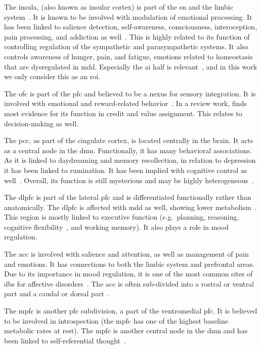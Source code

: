 The insula, (also known as insular cortex) is part of the \gls{sn} and the limbic system~\parencite{Uddin2017}.
It is known to be involved with modulation of emotional processing.
It has been linked to salience detection, self-awareness, consciousness, interoception, pain processing, and addiction as well~\parencite{Menon2010}.
This is highly related to its function of controlling regulation of the sympathetic and parasympathetic systems.
It also controls awareness of hunger, pain, and fatigue, emotions related to homeostasis that are dysregulated in \gls{mdd}.
Especially the \gls{ai} half is relevant~\parencite{Pasquini2020}, and in this work we only consider this as an \gls{roi}.

The \gls{ofc} is part of the \gls{pfc} and believed to be a nexus for sensory integration.
It is involved with emotional and reward-related behavior~\parencite{Kringelbach2005}.
In a review work, \textcite{Stalnaker2015} finds most evidence for its function in credit and value assignment.
This relates to decision-making as well.

The \gls{pcc}, as part of the cingulate cortex, is located centrally in the brain.
It acts as a central node in the \gls{dmn}.
Functionally, it has many behavioral associations.
As it is linked to daydreaming and memory recollection, in relation to depression it has been linked to rumination.
It has been implied with cognitive control as well~\parencite{Leech2012}.
Overall, its function is still mysterious and may be highly heterogeneous~\parencite{Leech2014}.

The \gls{dlpfc} is part of the lateral \gls{pfc} and is differentiated functionally rather than anatomically.
The \gls{dlpfc} is affected with \gls{mdd} as well, showing lower metabolism~\parencite{Pandya2012}.
This region is mostly linked to executive function (e.g.~planning, reasoning, cognitive flexibility~\parencite{Dajani2015}, and working memory).
It also plays a role in mood regulation.

The \gls{acc} is involved with salience and attention, as well as management of pain and emotions.
It has connections to both the limbic system and prefrontal areas.
Due to its importance in mood regulation, it is one of the most common sites of \gls{dbs} for affective disorders~\parencite{Drevets2008}.
The \gls{acc} is often sub-divided into a rostral or ventral part and a caudal or dorsal part~\parencite[see][for more clarification on subdivisions]{Stevens2011}.

The \gls{mpfc} is another \gls{pfc} subdivision, a part of the ventromedial \gls{pfc}.
It is believed to be involved in introspection (the \gls{mpfc} has one of the highest baseline metabolic rates at rest).
The \gls{mpfc} is another central node in the \gls{dmn} and has been linked to self-referential thought~\parencite{Gusnard2001}.


